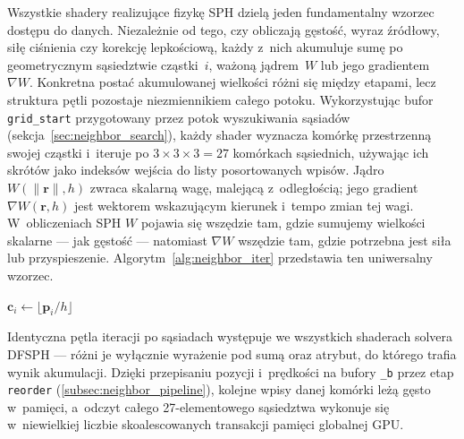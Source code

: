 Wszystkie shadery realizujące fizykę SPH dzielą jeden fundamentalny wzorzec
dostępu do danych. Niezależnie od tego, czy obliczają gęstość, wyraz
źródłowy, siłę ciśnienia czy korekcję lepkościową, każdy z~nich akumuluje
sumę po geometrycznym sąsiedztwie cząstki~$i$, ważoną jądrem~$W$ lub jego
gradientem~$\nabla W$. Konkretna postać akumulowanej wielkości różni się
między etapami, lecz struktura pętli pozostaje niezmiennikiem całego potoku.
Wykorzystując bufor \texttt{grid\_start} przygotowany przez potok
wyszukiwania sąsiadów (sekcja~\ref{sec:neighbor_search}), każdy shader
wyznacza komórkę przestrzenną swojej cząstki i~iteruje po
$3 \times 3 \times 3 = 27$ komórkach sąsiednich, używając ich skrótów jako
indeksów wejścia do listy posortowanych wpisów.
Jądro $W(\|\mathbf{r}\|, h)$ zwraca skalarną wagę, malejącą z~odległością;
jego gradient $\nabla W(\mathbf{r}, h)$ jest wektorem wskazującym kierunek
i~tempo zmian tej wagi.
W~obliczeniach SPH $W$ pojawia się wszędzie tam, gdzie sumujemy wielkości
skalarne --- jak gęstość --- natomiast $\nabla W$ wszędzie tam, gdzie
potrzebna jest siła lub przyspieszenie.
Algorytm~\ref{alg:neighbor_iter} przedstawia ten uniwersalny wzorzec.

\begin{algorithm}[htbp]
\caption{Wspólny wzorzec iteracji po sąsiadach w~shaderach SPH}
\label{alg:neighbor_iter}
$\mathbf{c}_i \leftarrow \lfloor \mathbf{p}_i / h \rfloor$\;
\end{algorithm}

Identyczna pętla iteracji po sąsiadach występuje we wszystkich shaderach solvera DFSPH
--- różni je wyłącznie wyrażenie pod sumą
oraz atrybut, do którego trafia wynik akumulacji. Dzięki przepisaniu pozycji
i~prędkości na bufory \texttt{\_b} przez etap \texttt{reorder}
(\ref{subsec:neighbor_pipeline}), kolejne wpisy danej komórki leżą gęsto
w~pamięci, a~odczyt całego 27-elementowego sąsiedztwa wykonuje się
w~niewielkiej liczbie skoalescowanych transakcji pamięci globalnej GPU.

